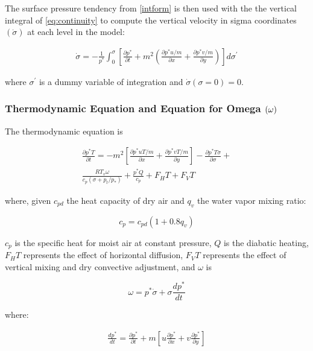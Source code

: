 The surface pressure tendency from \ref{intform} is then used with the
the vertical integral of \ref{eq:continuity} to compute the vertical
velocity in sigma coordinates $(\dot{\sigma})$ at each
level in the model:

\begin{eqnarray}
	\dot{\sigma} = - \frac{1}{p^{\ast}} \int_{0}^{\sigma}{
		\left[ \frac{\partial{p^{\ast}}}{\partial{t}} +
		m^2 \left(\frac{\partial{p^{\ast}u/m}}{\partial{x}} +
		                 \frac{\partial{p^{\ast}v/m}}{\partial{y}}
	 \right) \right] d\sigma^\prime}
\end{eqnarray}

where $\sigma^\prime$ is a dummy variable of integration and
$\dot{\sigma}(\sigma=0)=0$.

\subsubsection{Thermodynamic Equation and Equation for Omega ${\bf (\omega)}$}

The thermodynamic equation is

\begin{eqnarray}
\frac{\partial{p^{\ast}T}}{\partial{t}} = 
-m^2 \left[ \frac{\partial{p^{\ast}uT/m}}{\partial{x}} +
	    \frac{\partial{p^{\ast}vT/m}}{\partial{y}} \right] -
	    \frac{\partial{p^{\ast}T\dot{\sigma}}}{\partial{\sigma}} +
	    \nonumber \\
	\frac{RT_v\omega}{c_{p}(\sigma + p_t/p_{\ast})} +
	\frac{p^{\ast}Q}{c_{p}} + F_HT + F_VT
\end{eqnarray}

where, given $c_{pd}$ the heat capacity of dry air and $q_v$ the water vapor
mixing ratio:

\begin{equation}
c_{p} = c_{pd} \left( 1 + 0.8q_v \right)
\end{equation}

$c_p$ is the specific heat for moist air at constant pressure, $Q$ is the
diabatic heating, $F_HT$ represents the effect of horizontal diffusion,
$F_VT$ represents the effect of vertical mixing and dry convective adjustment,
and $\omega$ is

\begin{equation}
\omega = p^{\ast} \dot{\sigma} + \sigma \frac{dp^{\ast}}{dt}
\end{equation}

where:
  
\begin{eqnarray}
\frac{dp^{\ast}}{dt} =
   \frac{\partial{p^{\ast}}}{\partial{t}} + m
   \left[ u \frac{\partial{p^{\ast}}}{\partial{x}} +
          v \frac{\partial{p^{\ast}}}{\partial{y}} \right]
\end{eqnarray}

